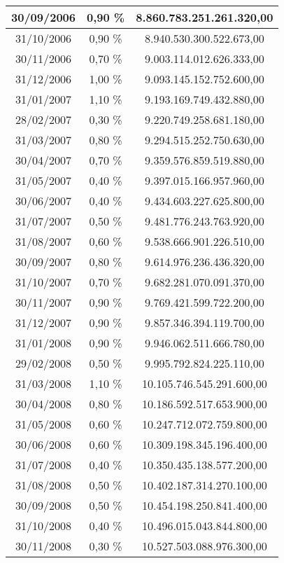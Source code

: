 \begin{center}
\begin{longtable}{|c|c|c|}
30/09/2006 & 0,90 \% & 8.860.783.251.261.320,00  \\ \hline
31/10/2006 & 0,90 \% & 8.940.530.300.522.673,00  \\ \hline
30/11/2006 & 0,70 \% & 9.003.114.012.626.333,00  \\ \hline
31/12/2006 & 1,00 \% & 9.093.145.152.752.600,00  \\ \hline
31/01/2007 & 1,10 \% & 9.193.169.749.432.880,00  \\ \hline
28/02/2007 & 0,30 \% & 9.220.749.258.681.180,00  \\ \hline
31/03/2007 & 0,80 \% & 9.294.515.252.750.630,00  \\ \hline
30/04/2007 & 0,70 \% & 9.359.576.859.519.880,00  \\ \hline
31/05/2007 & 0,40 \% & 9.397.015.166.957.960,00  \\ \hline
30/06/2007 & 0,40 \% & 9.434.603.227.625.800,00  \\ \hline
31/07/2007 & 0,50 \% & 9.481.776.243.763.920,00  \\ \hline
31/08/2007 & 0,60 \% & 9.538.666.901.226.510,00  \\ \hline
30/09/2007 & 0,80 \% & 9.614.976.236.436.320,00  \\ \hline
31/10/2007 & 0,70 \% & 9.682.281.070.091.370,00  \\ \hline
30/11/2007 & 0,90 \% & 9.769.421.599.722.200,00  \\ \hline
31/12/2007 & 0,90 \% & 9.857.346.394.119.700,00  \\ \hline
31/01/2008 & 0,90 \% & 9.946.062.511.666.780,00  \\ \hline
29/02/2008 & 0,50 \% & 9.995.792.824.225.110,00  \\ \hline
31/03/2008 & 1,10 \% & 10.105.746.545.291.600,00  \\ \hline
30/04/2008 & 0,80 \% & 10.186.592.517.653.900,00  \\ \hline
31/05/2008 & 0,60 \% & 10.247.712.072.759.800,00  \\ \hline
30/06/2008 & 0,60 \% & 10.309.198.345.196.400,00  \\ \hline
31/07/2008 & 0,40 \% & 10.350.435.138.577.200,00  \\ \hline
31/08/2008 & 0,50 \% & 10.402.187.314.270.100,00  \\ \hline
30/09/2008 & 0,50 \% & 10.454.198.250.841.400,00  \\ \hline
31/10/2008 & 0,40 \% & 10.496.015.043.844.800,00  \\ \hline
30/11/2008 & 0,30 \% & 10.527.503.088.976.300,00  \\ \hline

\end{longtable}
\end{center}
